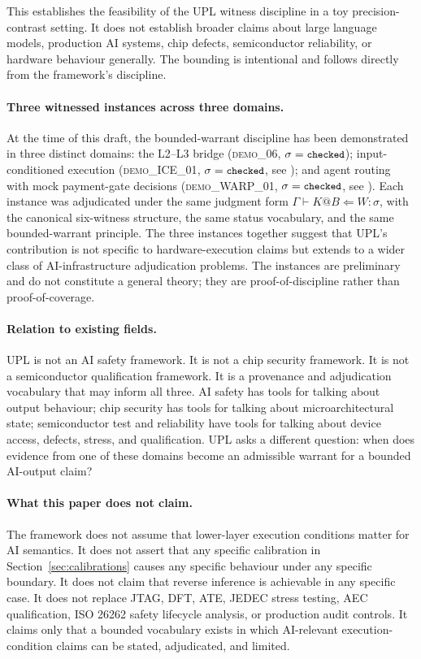 \documentclass[11pt, a4paper]{article}
\theoremstyle{upldef}
\newcommand{\statuslabel}[1]{\texttt{\small #1}}
\begin{document}
This establishes the feasibility of the UPL witness discipline in a
toy precision-contrast setting. It does not establish broader claims
about large language models, production AI systems, chip defects,
semiconductor reliability, or hardware behaviour generally. The
bounding is intentional and follows directly from the framework's
discipline.

\paragraph{Three witnessed instances across three domains.}
At the time of this draft, the bounded-warrant discipline has been
demonstrated in three distinct domains: the L2--L3 bridge
(\textsc{demo\_06}, $\sigma = \statuslabel{checked}$);
input-conditioned execution (\textsc{demo\_ICE\_01}, $\sigma =
\statuslabel{checked}$, see \citep{vasen2026ice}); and agent routing
with mock payment-gate decisions (\textsc{demo\_WARP\_01}, $\sigma =
\statuslabel{checked}$, see \citep{vasen2026warp}). Each instance
was adjudicated under the same judgment form
$\Gamma \vdash K @ B \Leftarrow W : \sigma$, with the canonical
six-witness structure, the same status vocabulary, and the same
bounded-warrant principle. The three instances together suggest
that UPL's contribution is not specific to hardware-execution
claims but extends to a wider class of AI-infrastructure
adjudication problems. The instances are preliminary and do not
constitute a general theory; they are proof-of-discipline rather
than proof-of-coverage.

\paragraph{Relation to existing fields.}
UPL is not an AI safety framework. It is not a chip security
framework. It is not a semiconductor qualification framework. It is
a provenance and adjudication vocabulary that may inform all three.
AI safety has tools for talking about output behaviour; chip security
has tools for talking about microarchitectural state; semiconductor
test and reliability have tools for talking about device access,
defects, stress, and qualification. UPL asks a different question:
when does evidence from one of these domains become an admissible
warrant for a bounded AI-output claim?

\paragraph{What this paper does not claim.}
The framework does not assume that lower-layer execution conditions
matter for AI semantics. It does not assert that any specific
calibration in Section~\ref{sec:calibrations} causes any specific
behaviour under any specific boundary. It does not claim that reverse
inference is achievable in any specific case. It does not replace
JTAG, DFT, ATE, JEDEC stress testing, AEC qualification, ISO 26262
safety lifecycle analysis, or production audit controls. It claims
only that a bounded vocabulary exists in which AI-relevant
execution-condition claims can be stated, adjudicated, and limited.
\end{document}
